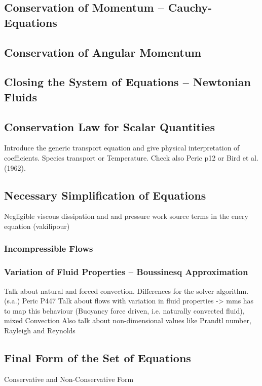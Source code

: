     \subsection{Conservation of Momentum -- Cauchy-Equations}
    \subsection{Conservation of Angular Momentum}
    \subsection{Closing the System of Equations -- Newtonian Fluids}
    \subsection{Conservation Law for Scalar Quantities}
        Introduce the generic transport equation and give physical interpretation of coefficients. Species transport or Temperature.
        Check also Peric p12 or Bird et al. (1962).
    \subsection{Necessary Simplification of Equations}
        Negligible viscous dissipation and and pressure work source terms in the enery equation (vakilipour)
      \subsubsection{Incompressible Flows}
      \subsubsection{Variation of Fluid Properties -- Boussinesq Approximation}
      Talk about natural and forced convection. Differences for the solver algorithm. (s.a.) Peric P447
      Talk about flows with variation in fluid properties -> mms has to map this behaviour (Buoyancy force driven, i.e. naturally convected fluid), mixed Convection
      Also talk about non-dimensional values like Prandtl number, Rayleigh and Reynolds
    \subsection{Final Form of the Set of Equations}
        Conservative and Non-Conservative Form
